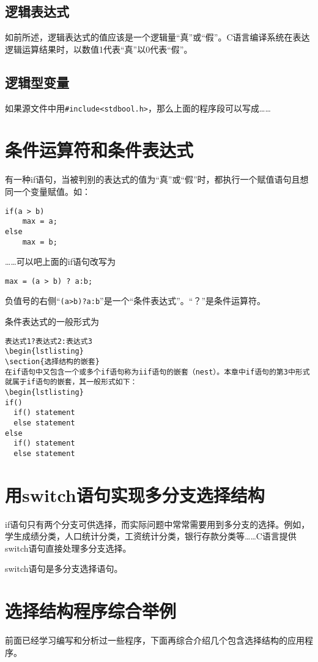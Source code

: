 \subsection{逻辑表达式}
如前所述，逻辑表达式的值应该是一个逻辑量“真”或“假”。C语言编译系统在表达逻辑运算结果时，以数值1代表“真”以0代表“假”。
\subsection{逻辑型变量}
如果源文件中用\verb|#include<stdbool.h>|，那么上面的程序段可以写成……
\section{条件运算符和条件表达式}
有一种if语句，当被判别的表达式的值为“真”或“假”时，都执行一个赋值语句且想同一个变量赋值。如：
\begin{lstlisting}
if(a > b)
	max = a;
else
	max = b;
\end{lstlisting}
……可以吧上面的if语句改写为
\begin{lstlisting}
max = (a > b) ? a:b;
\end{lstlisting}
负值号的右侧“\verb|(a>b)?a:b|”是一个“条件表达式”。“？”是条件运算符。

条件表达式的一般形式为
\begin{lstlisting}
表达式1?表达式2:表达式3
\begin{lstlisting}
\section{选择结构的嵌套}
在if语句中又包含一个或多个if语句称为iif语句的嵌套（nest）。本章中if语句的第3中形式就属于if语句的嵌套，其一般形式如下：
\begin{lstlisting}
if()
  if() statement
  else statement
else
  if() statement
  else statement
\end{lstlisting}
\section{用switch语句实现多分支选择结构}
if语句只有两个分支可供选择，而实际问题中常常需要用到多分支的选择。例如，学生成绩分类，人口统计分类，工资统计分类，银行存款分类等……C语言提供switch语句直接处理多分支选择。

switch语句是多分支选择语句。
\section{选择结构程序综合举例}
前面已经学习编写和分析过一些程序，下面再综合介绍几个包含选择结构的应用程序。

